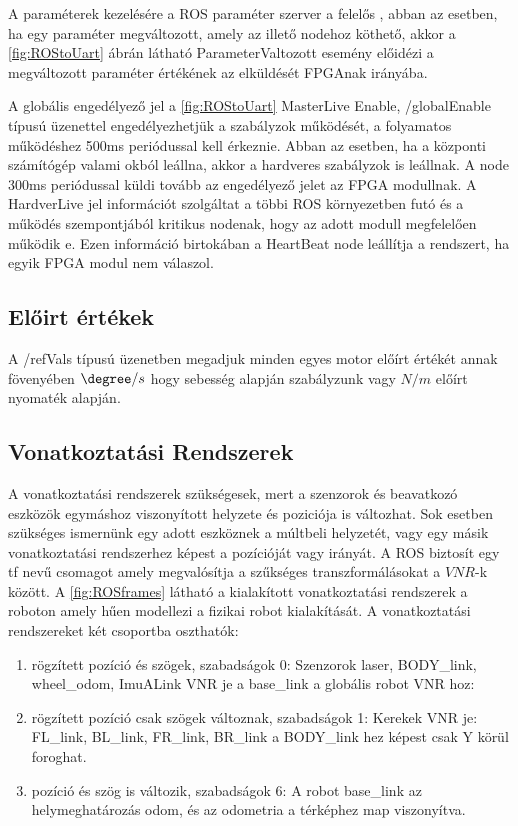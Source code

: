 A paraméterek kezelésére a ROS paraméter szerver a felelős \cite{parameterserver}, abban az esetben, ha egy paraméter megváltozott, amely az illető nodehoz köthető, akkor a \ref{fig:ROStoUart} ábrán látható ParameterValtozott esemény előidézi a  megváltozott paraméter értékének az elküldését  FPGAnak irányába.

A globális engedélyező jel a \ref{fig:ROStoUart} MasterLive Enable,  /globalEnable típusú üzenettel engedélyezhetjük a szabályzok működését, a folyamatos működéshez 500ms periódussal kell érkeznie. Abban az esetben, ha a központi számítógép valami okból leállna, akkor a hardveres szabályzok is leállnak. A node 300ms periódussal küldi tovább az engedélyező jelet az FPGA modullnak. A HardverLive jel információt szolgáltat a többi ROS környezetben futó és a működés szempontjából kritikus nodenak, hogy az adott modull megfelelően működik e. Ezen információ birtokában a HeartBeat node leállítja a rendszert, ha egyik FPGA modul nem válaszol.

\renewcommand{\img}{SajatRobot/ROS/NodeUML.jpg}
\renewcommand{\sources}{*}
\renewcommand{\captionn}{ROS integrálása Uart protokolhoz.}
\renewcommand{\figlabel}{ROStoUart}


\subsection{Előirt értékek}
A /refVals típusú üzenetben megadjuk minden egyes motor előírt értékét annak fövenyében $\degree/s$ hogy sebesség alapján szabályzunk vagy $N/m$ előírt nyomaték alapján.


\subsection{Vonatkoztatási Rendszerek }
A  vonatkoztatási rendszerek szükségesek, mert a szenzorok és beavatkozó eszközök egymáshoz viszonyított helyzete és poziciója is változhat. Sok esetben szükséges ismernünk egy adott eszköznek a múltbeli helyzetét, vagy egy másik vonatkoztatási rendszerhez képest a pozícióját vagy irányát. A ROS biztosít egy tf \cite{rosTF} nevű csomagot amely megvalósítja a szűkséges transzformálásokat a $VNR$-k között. 
A \ref{fig:ROSframes} látható a kialakított vonatkoztatási rendszerek a roboton amely hűen modellezi a fizikai robot kialakítását.
A vonatkoztatási rendszereket két csoportba oszthatók:

\begin{enumerate}[label=(\alph*)]
\item rögzített pozíció és szögek, szabadságok 0:
Szenzorok laser, BODY\_link, wheel\_odom, ImuALink VNR je a base\_link a globális robot VNR hoz:
\item rögzített pozíció csak szögek változnak, szabadságok 1: Kerekek VNR je: FL\_link, BL\_link, FR\_link, BR\_link a BODY\_link hez képest csak Y körül foroghat.
\item pozíció és szög is változik, szabadságok 6:
A robot base\_link az helymeghatározás odom, és az odometria a térképhez map viszonyítva.
\end{enumerate}


